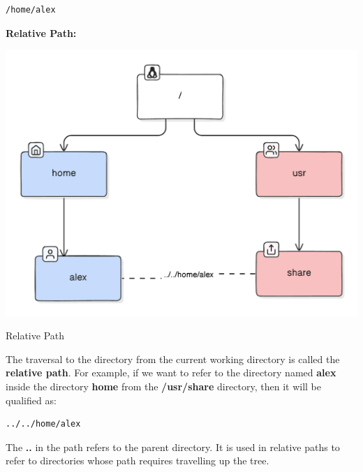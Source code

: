 \begin{lstlisting}[language=bash]
  /home/alex
\end{lstlisting}

\textbf{Relative Path:}

\begin{marginfigure}
	\includegraphics{images/pdf/relpath.pdf}
	\caption[Relative Path]{Relative Path}
\end{marginfigure}

The traversal to the directory from the current working directory is called the \textbf{relative path}. For example, if we want to refer to the directory named \textbf{alex} inside the directory \textbf{home} from the \textbf{/usr/share} directory, then it will be qualified as:

\begin{lstlisting}[language=bash]
  ../../home/alex
\end{lstlisting}

\begin{remark}
  The \textbf{..} in the path refers to the parent directory. It is used in relative paths to refer to directories whose path requires travelling up the tree.
\end{remark}

